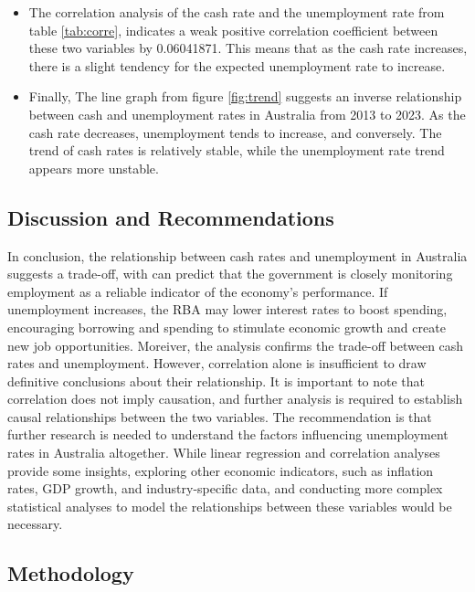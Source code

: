 \documentclass[11pt,a4paper,]{article}
\providecommand{\tightlist}{%
  \setlength{\itemsep}{0pt}\setlength{\parskip}{0pt}}
\begin{document}
\begin{itemize}
\tightlist
\item
  The correlation analysis of the cash rate and the unemployment rate from table \ref{tab:corre}, indicates a weak positive correlation coefficient between these two variables by 0.06041871. This means that as the cash rate increases, there is a slight tendency for the expected unemployment rate to increase.
\item
  Finally, The line graph from figure \ref{fig:trend} suggests an inverse relationship between cash and unemployment rates in Australia from 2013 to 2023. As the cash rate decreases, unemployment tends to increase, and conversely. The trend of cash rates is relatively stable, while the unemployment rate trend appears more unstable.
\end{itemize}

\hypertarget{discussion-and-recommendations}{%
\subsection{Discussion and Recommendations}\label{discussion-and-recommendations}}

In conclusion, the relationship between cash rates and unemployment in Australia suggests a trade-off, with can predict that the government is closely monitoring employment as a reliable indicator of the economy's performance. If unemployment increases, the RBA may lower interest rates to boost spending, encouraging borrowing and spending to stimulate economic growth and create new job opportunities.
Moreiver, the analysis confirms the trade-off between cash rates and unemployment. However, correlation alone is insufficient to draw definitive conclusions about their relationship. It is important to note that correlation does not imply causation, and further analysis is required to establish causal relationships between the two variables.
The recommendation is that further research is needed to understand the factors influencing unemployment rates in Australia altogether. While linear regression and correlation analyses provide some insights, exploring other economic indicators, such as inflation rates, GDP growth, and industry-specific data, and conducting more complex statistical analyses to model the relationships between these variables would be necessary.

\hypertarget{methodology-1}{%
\subsection{Methodology}\label{methodology-1}}
\end{document}
